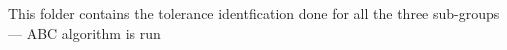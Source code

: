 This folder contains the tolerance identfication done for all the three sub-groups--- ABC algorithm is run
